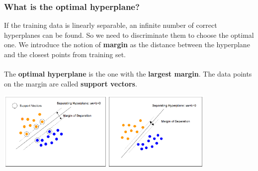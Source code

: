 \documentclass{beamer}
\begin{document}
\begin{frame}
  \frametitle{What is the optimal hyperplane?}
  If the training data is linearly separable, an infinite number of correct
  hyperplanes can be found. So we need to discriminate them to choose the
  optimal one. We introduce the notion of \textbf{margin} as the distance
  between the hyperplane and the closest points from training set.
  \\~\\
  The \textbf{optimal hyperplane} is the one with the \textbf{largest margin}.
  The data points on the margin are called \textbf{support vectors}.

  \begin{center}
    \includegraphics[height=3.8cm]{img/svm_margin.png}
  \end{center}
\end{frame}
\end{document}
